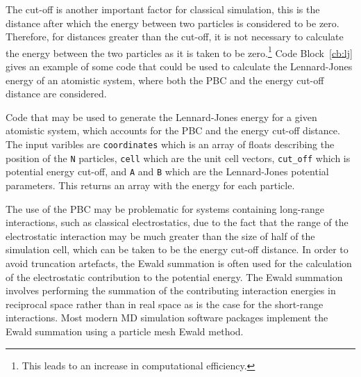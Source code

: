 The cut-off is another important factor for classical simulation, this is the distance after which the energy between two particles is considered to be zero.
Therefore, for distances greater than the cut-off, it is not necessary to calculate the energy between the two particles as it is taken to be zero.\footnote{This leads to an increase in computational efficiency.}
Code Block~\ref{cb:lj} gives an example of some code that could be used to calculate the Lennard-Jones energy of an atomistic system, where both the PBC and the energy cut-off distance are considered.
%
\begin{listing}[b]
    \forcerectofloat
    \centering
    \caption{Code that may be used to generate the Lennard-Jones energy for a given atomistic system, which accounts for the PBC and the energy cut-off distance. The input varibles are \texttt{coordinates} which is an array of floats describing the position of the \texttt{N} particles, \texttt{cell} which are the unit cell vectors, \texttt{cut\_off} which is potential energy cut-off, and \texttt{A} and \texttt{B} which are the Lennard-Jones potential parameters. This returns an array with the energy for each particle.}
    
    \label{cb:lj}
\end{listing}
%

The use of the PBC may be problematic for systems containing long-range interactions, such as classical electrostatics, due to the fact that the range of the electrostatic interaction may be much greater than the size of half of the simulation cell, which can be taken to be the energy cut-off distance.
In order to avoid truncation artefacts, the Ewald summation is often used for the calculation of the electrostatic contribution to the potential energy.\autocite{ewald_berechnung_1921}
The Ewald summation involves performing the summation of the contributing interaction energies in reciprocal space rather than in real space as is the case for the short-range interactions.
Most modern MD simulation software packages implement the Ewald summation using a particle mesh Ewald method.\autocite{essmann_smooth_1995}

